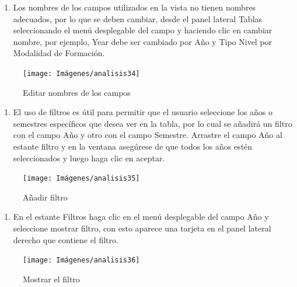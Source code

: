 \documentclass[
]{book}
\providecommand{\tightlist}{%
  \setlength{\itemsep}{0pt}\setlength{\parskip}{0pt}}
\begin{document}
\begin{enumerate}
\def\labelenumi{\arabic{enumi}.}
\setcounter{enumi}{4}
\tightlist
\item
  Los nombres de los campos utilizados en la vista no tienen nombres adecuados, por lo que se deben cambiar, desde el panel lateral Tablas seleccionando el menú desplegable del campo y haciendo clic en cambiar nombre, por ejemplo, Year debe ser cambiado por Año y Tipo Nivel por Modalidad de Formación.
\end{enumerate}

\begin{figure}

{\centering \texttt{[image: Imágenes/analisis34]} 

}

\caption{Editar nombres de los campos}\label{fig:paso5tablatexto-fig}
\end{figure}

\begin{enumerate}
\def\labelenumi{\arabic{enumi}.}
\setcounter{enumi}{5}
\tightlist
\item
  El uso de filtros es útil para permitir que el usuario seleccione los años o semestres específicos que desea ver en la tabla, por lo cual se añadirá un filtro con el campo Año y otro con el campo Semestre. Arrastre el campo Año al estante filtro y en la ventana asegúrese de que todos los años estén seleccionados y luego haga clic en aceptar.
\end{enumerate}

\begin{figure}

{\centering \texttt{[image: Imágenes/analisis35]} 

}

\caption{Añadir filtro}\label{fig:paso6tablatexto-fig}
\end{figure}

\begin{enumerate}
\def\labelenumi{\arabic{enumi}.}
\setcounter{enumi}{6}
\tightlist
\item
  En el estante Filtros haga clic en el menú desplegable del campo Año y seleccione mostrar filtro, con esto aparece una tarjeta en el panel lateral derecho que contiene el filtro.
\end{enumerate}

\begin{figure}

{\centering \texttt{[image: Imágenes/analisis36]} 

}

\caption{Mostrar el filtro}\label{fig:paso7tablatexto-fig}
\end{figure}
\end{document}
